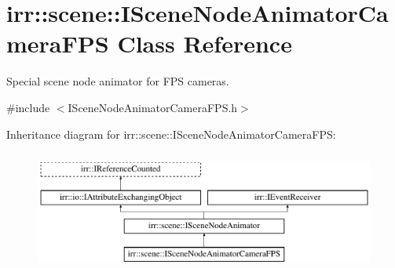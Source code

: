 \hypertarget{classirr_1_1scene_1_1ISceneNodeAnimatorCameraFPS}{}\section{irr\+:\+:scene\+:\+:I\+Scene\+Node\+Animator\+Camera\+F\+PS Class Reference}
\label{classirr_1_1scene_1_1ISceneNodeAnimatorCameraFPS}


Special scene node animator for F\+PS cameras.  




{\ttfamily \#include $<$I\+Scene\+Node\+Animator\+Camera\+F\+P\+S.\+h$>$}

Inheritance diagram for irr\+:\+:scene\+:\+:I\+Scene\+Node\+Animator\+Camera\+F\+PS\+:\begin{figure}[H]
\begin{center}
\leavevmode
\includegraphics[height=4.000000cm]{classirr_1_1scene_1_1ISceneNodeAnimatorCameraFPS}
\end{center}
\end{figure}
